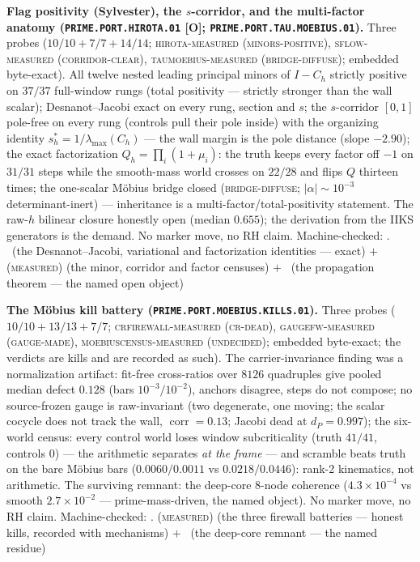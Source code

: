 \documentclass[11pt,a4paper]{article}
\theoremstyle{definition}
\begin{document}
\par\smallskip\noindent\textbf{Flag positivity (Sylvester), the
$s$-corridor, and the multi-factor anatomy
(\texttt{PRIME.PORT.\allowbreak HIROTA.01} [O];
\texttt{PRIME.PORT.TAU.\allowbreak MOEBIUS.01}).}
Three probes ($10/10 + 7/7 + 14/14$; \textsc{hirota-measured
(minors-positive)}, \textsc{sflow-measured (corridor-clear)},
\textsc{taumoebius-measured (bridge-diffuse)}; embedded
byte-exact).  All twelve nested leading principal minors of $I
- C_h$ strictly positive on $37/37$ full-window rungs (total
positivity --- strictly stronger than the wall scalar);
Desnanot--Jacobi exact on every rung, section and $s$; the
$s$-corridor $[0, 1]$ pole-free on every rung (controls pull
their pole inside) with the organizing identity $s^{*}_h =
1/\lambda_{\max}(C_h)$ --- the wall margin is the pole distance
(slope $-2.90$); the exact factorization $Q_h = \prod_i(1 +
\mu_i)$: the truth keeps every factor off $-1$ on $31/31$ steps
while the smooth-mass world crosses on $22/28$ and flips $Q$
thirteen times; the one-scalar M\"obius bridge closed
(\textsc{bridge-diffuse}; $|\alpha| \sim 10^{-3}$
determinant-inert) --- inheritance is a
multi-factor/total-positivity statement.  The raw-$h$ bilinear
closure honestly open (median $0.655$); the derivation from the
IIKS generators is the demand.  No marker move, no RH claim.
Machine-checked: .
\mE\ (the Desnanot--Jacobi, variational and factorization
identities --- exact) $+$ (\textsc{measured}) (the minor,
corridor and factor censuses) $+$ \mO\ (the propagation theorem
--- the named open object)
\par\smallskip

\par\smallskip\noindent\textbf{The M\"obius kill battery
(\texttt{PRIME.PORT.MOEBIUS.\allowbreak KILLS.01}).}
Three probes ($10/10 + 13/13 + 7/7$;
\textsc{crfirewall-measured (cr-dead)},
\textsc{gaugefw-measured (gauge-made)},
\textsc{moebiuscensus-measured (undecided)}; embedded
byte-exact; the verdicts are kills and are recorded as such).
The carrier-invariance finding was a normalization artifact:
fit-free cross-ratios over $8126$ quadruples give pooled median
defect $0.128$ (bars $10^{-3}/10^{-2}$), anchors disagree,
steps do not compose; no source-frozen gauge is raw-invariant
(two degenerate, one moving; the scalar cocycle does not track
the wall, $\operatorname{corr} = 0.13$; Jacobi dead at $d_P =
0.997$); the six-world census: every control world loses window
subcriticality (truth $41/41$, controls $0$) --- the arithmetic
separates \emph{at the frame} --- and scramble beats truth on
the bare M\"obius bars ($0.0060/0.0011$ vs $0.0218/0.0446$):
rank-2 kinematics, not arithmetic.  The surviving remnant: the
deep-core $8$-node coherence ($4.3\times10^{-4}$ vs smooth
$2.7\times10^{-2}$ --- prime-mass-driven, the named object).
No marker move, no RH claim.
Machine-checked: .
(\textsc{measured}) (the three firewall batteries --- honest
kills, recorded with mechanisms) $+$ \mO\ (the deep-core
remnant --- the named residue)
\par\smallskip
\end{document}

